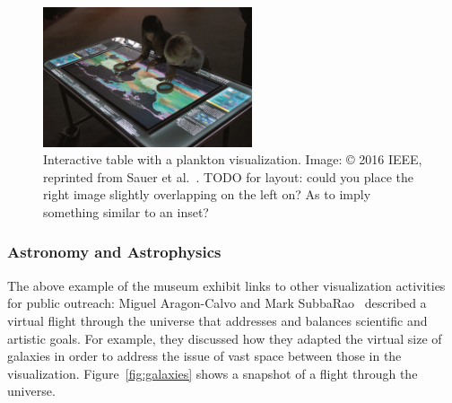 \documentclass[10pt,journal,compsoc]{IEEEtran}
\begin{document}
{\begin{figure}[th]
    \begin{center}    
        \includegraphics[width=0.55\textwidth]{museum1.png} \hspace{-3em} 
        \caption{Interactive table with a plankton visualization. Image: \copyright{} 2016 IEEE, reprinted from Sauer et al.~\cite{Sauer2016}. TODO for layout: could you place the right image slightly overlapping on the left on? As to imply something similar to an inset?
  \label{fig:museum}}        
    \end{center}
\end{figure}



\subsubsection{Astronomy and Astrophysics}


The above example of the museum exhibit links to other visualization activities for public outreach: 
Miguel Aragon-Calvo and Mark SubbaRao~\cite{Aragon-Calvo2015} described a virtual flight through the universe that addresses and balances scientific and artistic goals. For example, they discussed how they adapted the virtual size of galaxies in order to address the issue of vast space between those in the visualization. Figure~\ref{fig:galaxies} shows a snapshot of a flight through the universe.

}
\end{document}
